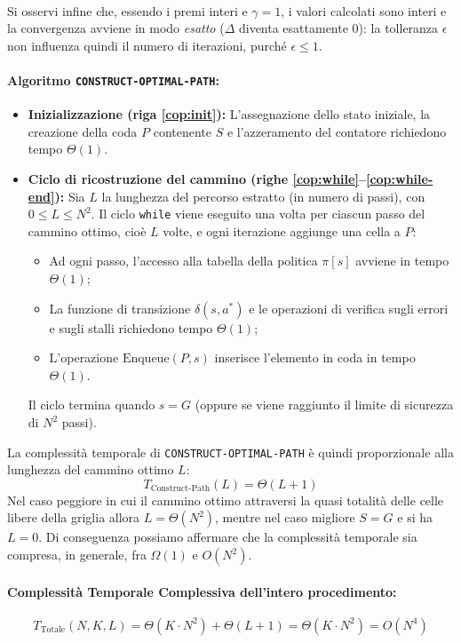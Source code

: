 \noindent\\
Si osservi infine che, essendo i premi interi e $\gamma = 1$, i valori calcolati sono interi e la convergenza avviene in modo \textit{esatto} ($\Delta$ diventa esattamente $0$): la tolleranza $\epsilon$ non influenza quindi il numero di iterazioni, purché $\epsilon \le 1$.

\clearpage
\paragraph{Algoritmo \texttt{CONSTRUCT-OPTIMAL-PATH}:}
\begin{itemize}
    \item \textbf{Inizializzazione (riga \ref{cop:init}):} L'assegnazione dello stato iniziale, la creazione della coda $P$ contenente $S$ e l'azzeramento del contatore richiedono tempo $\Theta(1)$.
    \item \textbf{Ciclo di ricostruzione del cammino (righe \ref{cop:while}--\ref{cop:while-end}):} Sia $L$ la lunghezza del percorso estratto (in numero di passi), con $0 \le L \le N^2$. Il ciclo \texttt{while} viene eseguito una volta per ciascun passo del cammino ottimo, cioè $L$ volte, e ogni iterazione aggiunge una cella a $P$:
    \begin{itemize}
        \item Ad ogni passo, l'accesso alla tabella della politica $\pi[s]$ avviene in tempo $\Theta(1)$;
        \item La funzione di transizione $\delta(s, a^*)$ e le operazioni di verifica sugli errori e sugli stalli richiedono tempo $\Theta(1)$;
        \item L'operazione $\text{Enqueue}(P, s)$ inserisce l'elemento in coda in tempo $\Theta(1)$.
    \end{itemize}
    Il ciclo termina quando $s = G$ (oppure se viene raggiunto il limite di sicurezza di $N^2$ passi).
\end{itemize}

\noindent
La complessità temporale di \texttt{CONSTRUCT-OPTIMAL-PATH} è quindi proporzionale alla lunghezza del cammino ottimo $L$:
\[
T_{\text{Construct-Path}}(L) = \Theta(L + 1)
\]
Nel caso peggiore in cui il cammino ottimo attraversi la quasi totalità delle celle libere della griglia allora $L = \Theta(N^2)$, mentre nel caso migliore $S = G$ e si ha $L = 0$. Di conseguenza possiamo affermare che la complessità temporale sia compresa, in generale, fra $\Omega(1)$ e $O(N^2)$.
\paragraph{Complessità Temporale Complessiva dell'intero procedimento:}
\[
T_{\text{Totale}}(N, K, L) = \Theta(K \cdot N^2) + \Theta(L + 1) = \Theta(K \cdot N^2) = O(N^4)
\]

